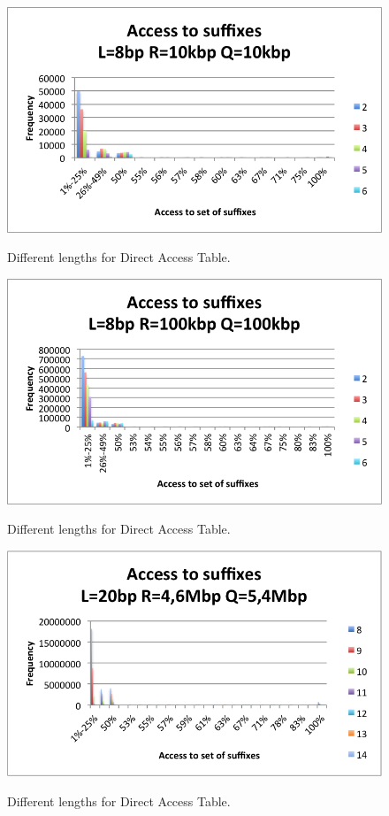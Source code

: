 \documentclass[runningheads,a4paper]{llncs}
\begin{document}
\begin{figure}
\centering
\includegraphics[scale=0.5]{10k.png}
\label{fig:10k}
\caption{Different lengths for Direct Access Table.}
\end{figure}
\begin{figure}
\centering
\includegraphics[scale=0.5]{100k.png}
\label{fig:100k}
\caption{Different lengths for Direct Access Table.}
\end{figure}
\begin{figure}
\centering
\includegraphics[scale=0.5]{Ecoli.png}
\label{fig:ecoli}
\caption{Different lengths for Direct Access Table.}
\end{figure}
\end{document}

